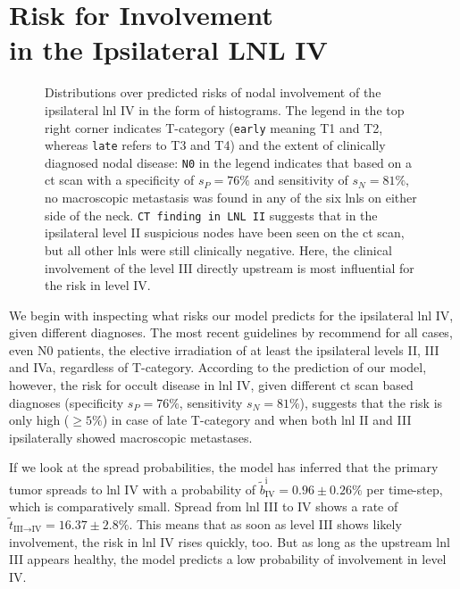 \documentclass[\relativeRoot/main.tex]{subfiles}
\begin{document}
\section[Risk for Involvement in the Ipsilateral LNL IV]{Risk for Involvement\\in the Ipsilateral LNL IV}
\label{sec:complete:ipsiIV}

\begin{figure}
    \centering
    \def\svgwidth{1.0\textwidth}
    
    \caption[
        Prediction by the complete model on ipsi LNL IV involvement
    ]{
        Distributions over predicted risks of nodal involvement of the ipsilateral \gls{lnl} IV in the form of histograms. The legend in the top right corner indicates T-category (\texttt{early} meaning T1 and T2, whereas \texttt{late} refers to T3 and T4) and the extent of clinically diagnosed nodal disease: \texttt{N0} in the legend indicates that based on a \gls{ct} scan with a specificity of $s_P = 76\%$ and sensitivity of $s_N = 81\%$, no macroscopic metastasis was found in any of the six \glspl{lnl} on either side of the neck. \texttt{CT finding in LNL II} suggests that in the ipsilateral level II suspicious nodes have been seen on the \gls{ct} scan, but all other \glspl{lnl} were still clinically negative. Here, the clinical involvement of the level III directly upstream is most influential for the risk in level IV.
    }
\end{figure}

We begin with inspecting what risks our model predicts for the ipsilateral \gls{lnl} IV, given different diagnoses. The most recent guidelines by  recommend for all cases, even N0 patients, the elective irradiation of at least the ipsilateral levels II, III and IVa, regardless of T-category. According to the prediction of our model, however, the risk for occult disease in \gls{lnl} IV, given different \gls{ct} scan based diagnoses (specificity $s_P = 76\%$, sensitivity $s_N = 81\%$), suggests that the risk is only high ($\geq 5\%$) in case of late T-category and when both \gls{lnl} II and III ipsilaterally showed macroscopic metastases.

If we look at the spread probabilities, the model has inferred that the primary tumor spreads to \gls{lnl} IV with a probability of $\tilde{b}_\text{IV}^\text{i} = 0.96 \pm 0.26 \%$ per time-step, which is comparatively small. Spread from \gls{lnl} III to IV shows a rate of $\tilde{t}_{\text{III}\rightarrow\text{IV}} = 16.37 \pm 2.8 \%$. This means that as soon as level III shows likely involvement, the risk in \gls{lnl} IV rises quickly, too. But as long as the upstream \gls{lnl} III appears healthy, the model predicts a low probability of involvement in level IV.
\end{document}
